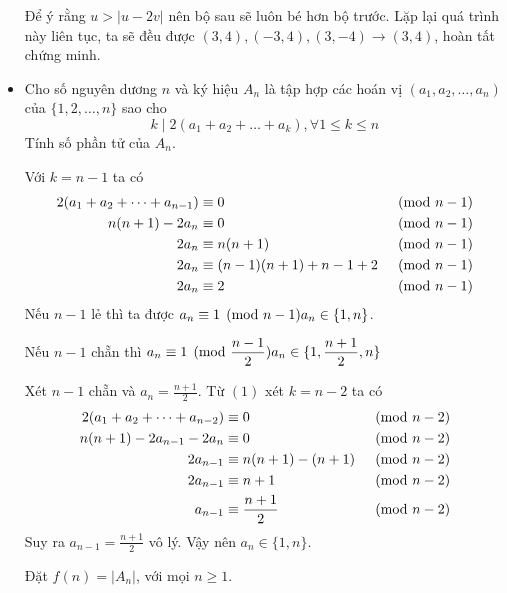 \documentclass[11pt]{scrartcl}
\begin{document}
\begin{itemize}[label=, leftmargin=0em, itemsep=0.5em]
\begin{sol}
        Để ý rằng $u > |u - 2v|$ nên bộ sau sẽ luôn bé hơn bộ trước. Lặp lại quá trình này liên tục, ta sẽ đều được $(3,4),(-3,4),(3,-4) \to (3,4)$, hoàn tất chứng minh.
    \end{sol}
    \item \begin{bt} Cho số nguyên dương $n$ và ký hiệu $A_n$ là tập hợp các hoán vị $(a_1,a_2,\dots,a_n)$ của $\{1,2,\dots,n\}$ sao cho 
    \[
        k \mid 2(a_1 + a_2 + \dots + a_k), \forall 1 \leq k \leq n \tag{1}
    \]
    Tính số phần tử của $A_n$.
    \end{bt}
    \begin{sol}
        Với $k = n - 1$ ta có  
        \[
        \begin{aligned}
            2(a_1 + a_2 + \dots + a_{n - 1}) &\equiv 0 &\pmod{n - 1}\\
            \lra n(n + 1) - 2a_n &\equiv 0 &\pmod{n - 1}\\
            \lra 2a_n &\equiv n(n + 1) &\pmod{n - 1}\\
            \lra 2a_n &\equiv (n - 1)(n + 1) + n - 1 + 2 &\pmod{n - 1}\\
            \lra 2a_n &\equiv 2 &\pmod{n - 1}
        \end{aligned}
        \]
        Nếu $n - 1$ lẻ thì ta được $a_n \equiv 1 \pmod{n - 1} \ra a_n \in \{1, n\}$.
        
        Nếu $n - 1$ chẵn thì $a_n \equiv 1 \pmod{\frac{n - 1}{2}} \ra a_n \in \{1,\frac{n + 1}{2},n\}$

        Xét $n - 1$ chẵn và $a_n = \frac{n + 1}{2}$. Từ $(1)$ xét $k = n - 2$ ta có 
        \[
        \begin{aligned}
            2(a_1 + a_2 + \dots + a_{n - 2}) &\equiv 0 &\pmod{n - 2}\\
            \lra n(n + 1) - 2a_{n - 1} - 2a_{n} &\equiv 0 &\pmod{n - 2}\\
            \lra 2a_{n - 1} &\equiv  n(n +1) - (n + 1)&\pmod{n - 2}\\
            \lra 2a_{n - 1} &\equiv n + 1 &\pmod{n - 2}\\
            \lra a_{n - 1} &\equiv \frac{n + 1}{2} &\pmod{n - 2}\\
        \end{aligned}
        \]
        Suy ra $a_{n - 1} = \frac{n + 1}{2}$ vô lý. Vậy nên $a_n \in \{1,n\}$.

        Đặt $f(n) = |A_n|$, với mọi $n \geq 1$. 


\end{sol}
\end{itemize}
\end{document}
